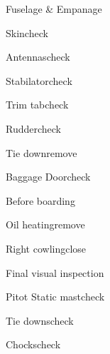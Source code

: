 \begin{multicols}{2}
\begin{checklist}{Fuselage \& Empanage}
  \item{Skin}{check}
  \item{Antennas}{check}
  \item{Stabilator}{check}
  \item{Trim tab}{check}
  \item{Rudder}{check}
  \item{Tie down}{remove}
  \item{Baggage Door}{check}
\end{checklist}

\begin{checklist}{Before boarding}
  \item{Oil heating}{remove}
  \item{Right cowling}{close}
  \item{Final visual inspection}{}
  \item{Pitot Static mast}{check}
  \item{Tie downs}{check}
  \item{Chocks}{check}
\end{checklist}
\end{multicols}
